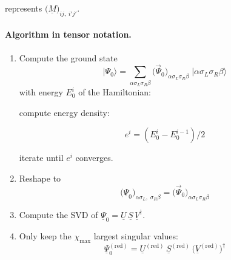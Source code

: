 represents $\big(\underline{M}\big)_{ij,\;i'j'}$.

\paragraph{Algorithm in tensor notation.}

\begin{enumerate}
\item Compute the ground state
\begin{equation}
|\Psi_0\rangle = \sum_{\alpha\sigma_L\sigma_R\beta}\big(\vec\Psi_0\big)_{\alpha\sigma_L\sigma_R\beta}\;\big|\alpha\sigma_L\sigma_R\beta\big\rangle
\end{equation}
with energy $E_{0}^{i}$ of the Hamiltonian:

\begin{center}
\end{center}

compute energy density:

\begin{equation}
    e^{i} = (E_{0}^{i}-E_{0}^{i-1})/2
\end{equation}

iterate until $e^{i}$ converges.

\item Reshape to
\begin{equation}
\big(\underline{\Psi}_0\big)_{\alpha\sigma_L,\;\sigma_R\beta} = \big(\vec\Psi_0\big)_{\alpha\sigma_L\sigma_R\beta}
\end{equation}

\item Compute the SVD of $\underline{\Psi}_0 = \underline{U}\,\underline{S}\,\underline{V}^{\dagger}$.

\item Only keep the $\chi_{\max}$ largest singular values:
\begin{equation}
\underline{\Psi}_0^{(\mathrm{red})} = \underline{U}^{(\mathrm{red})}\,\underline{S}^{(\mathrm{red})}\,\big(\underline{V}^{(\mathrm{red})}\big)^{\dagger}
\end{equation}


\end{enumerate}
